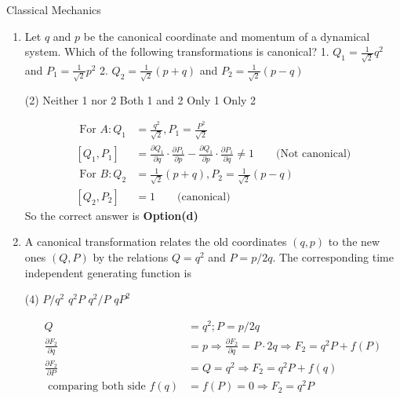 \begin{abox}
	Classical Mechanics
	\end{abox}
\begin{enumerate}
	\item Let $q$ and $p$ be the canonical coordinate and momentum of a dynamical system. Which of the following transformations is canonical?
	1. $Q_{1}=\frac{1}{\sqrt{2}} q^{2}$ and $P_{1}=\frac{1}{\sqrt{2}} p^{2}$
	2. $Q_{2}=\frac{1}{\sqrt{2}}(p+q)$ and $P_{2}=\frac{1}{\sqrt{2}}(p-q)$
{}
	 \begin{tasks}(2)
		\task[\textbf{a.}] Neither 1 nor 2
		\task[\textbf{b.}]Both 1 and 2
		\task[\textbf{c.}] Only 1
		\task[\textbf{d.}] Only 2
	\end{tasks}
\begin{answer}
	$$
	\begin{aligned}
	\text { For } A: Q_{1}&=\frac{q^{2}}{\sqrt{2}}, P_{1}=\frac{P^{2}}{\sqrt{2}}\\
	\left[Q_{1}, P_{1}\right]&=\frac{\partial Q_{1}}{\partial q} \cdot \frac{\partial P_{1}}{\partial p}-\frac{\partial Q_{1}}{\partial p} \cdot \frac{\partial P_{1}}{\partial q} \neq 1\qquad \text{(Not canonical)}\\
	\text { For } B: Q_{2}&=\frac{1}{\sqrt{2}}(p+q), P_{2}=\frac{1}{\sqrt{2}}(p-q)\\
	\left[Q_{2}, P_{2}\right]&=1\qquad
	\text{(canonical)}
\end{aligned}
$$
So the correct answer is \textbf{Option(d)}
\end{answer}
	\item A canonical transformation relates the old coordinates $(q, p)$ to the new ones $(Q, P)$ by the relations $Q=q^{2}$ and $P=p / 2 q$. The corresponding time independent generating function is
{}
	 \begin{tasks}(4)
		\task[\textbf{a.}]$P / q^{2}$
		\task[\textbf{b.}] $q^{2} P$
		\task[\textbf{c.}]$q^{2} / P$
		\task[\textbf{d.}] $q P^{2}$ 
	\end{tasks}
\begin{answer}
	$$
	\begin{aligned}
	Q&=q^{2} ; P=p / 2 q\\
	\frac{\partial F_{2}}{\partial q}&=p \Rightarrow \frac{\partial F_{2}}{\partial q}=P \cdot 2 q \Rightarrow F_{2}=q^{2} P+f(P)\\
	\frac{\partial F_{2}}{\partial P}&=Q=q^{2} \Rightarrow F_{2}=q^{2} P+f(q)\\
	\text { comparing both side } f(q)&=f(P)=0 \Rightarrow F_{2}=q^{2} P

\end{aligned}$$
\end{answer}
\end{enumerate}
